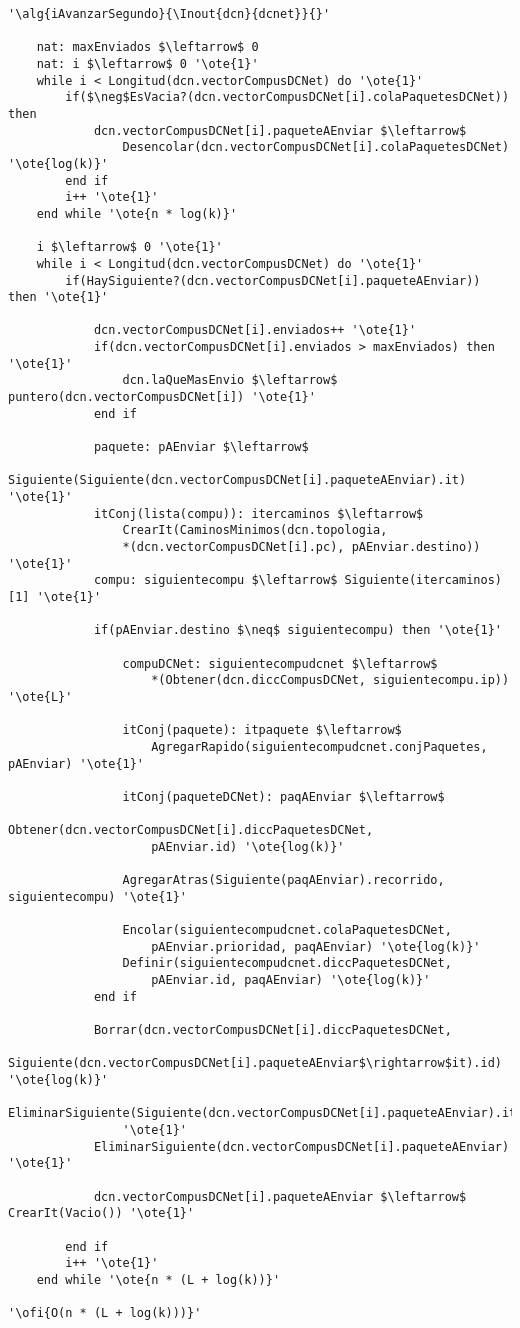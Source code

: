 \begin{lstlisting}[mathescape]
'\alg{iAvanzarSegundo}{\Inout{dcn}{dcnet}}{}'

	nat: maxEnviados $\leftarrow$ 0
	nat: i $\leftarrow$ 0 '\ote{1}'
	while i < Longitud(dcn.vectorCompusDCNet) do '\ote{1}'
		if($\neg$EsVacia?(dcn.vectorCompusDCNet[i].colaPaquetesDCNet)) then
			dcn.vectorCompusDCNet[i].paqueteAEnviar $\leftarrow$
				Desencolar(dcn.vectorCompusDCNet[i].colaPaquetesDCNet) '\ote{log(k)}'
		end if
		i++ '\ote{1}'
	end while '\ote{n * log(k)}'

	i $\leftarrow$ 0 '\ote{1}'
	while i < Longitud(dcn.vectorCompusDCNet) do '\ote{1}'
		if(HaySiguiente?(dcn.vectorCompusDCNet[i].paqueteAEnviar)) then '\ote{1}'

			dcn.vectorCompusDCNet[i].enviados++ '\ote{1}'
			if(dcn.vectorCompusDCNet[i].enviados > maxEnviados) then '\ote{1}'
				dcn.laQueMasEnvio $\leftarrow$ puntero(dcn.vectorCompusDCNet[i]) '\ote{1}'
			end if

			paquete: pAEnviar $\leftarrow$
				Siguiente(Siguiente(dcn.vectorCompusDCNet[i].paqueteAEnviar).it) '\ote{1}'
			itConj(lista(compu)): itercaminos $\leftarrow$
				CrearIt(CaminosMinimos(dcn.topologia,
				*(dcn.vectorCompusDCNet[i].pc), pAEnviar.destino)) '\ote{1}'
			compu: siguientecompu $\leftarrow$ Siguiente(itercaminos)[1] '\ote{1}'

			if(pAEnviar.destino $\neq$ siguientecompu) then '\ote{1}'

				compuDCNet: siguientecompudcnet $\leftarrow$
					*(Obtener(dcn.diccCompusDCNet, siguientecompu.ip)) '\ote{L}'

				itConj(paquete): itpaquete $\leftarrow$
					AgregarRapido(siguientecompudcnet.conjPaquetes, pAEnviar) '\ote{1}'

				itConj(paqueteDCNet): paqAEnviar $\leftarrow$
					Obtener(dcn.vectorCompusDCNet[i].diccPaquetesDCNet,
					pAEnviar.id) '\ote{log(k)}'

				AgregarAtras(Siguiente(paqAEnviar).recorrido, siguientecompu) '\ote{1}'

				Encolar(siguientecompudcnet.colaPaquetesDCNet,
					pAEnviar.prioridad, paqAEnviar) '\ote{log(k)}'
				Definir(siguientecompudcnet.diccPaquetesDCNet,
					pAEnviar.id, paqAEnviar) '\ote{log(k)}'
			end if

			Borrar(dcn.vectorCompusDCNet[i].diccPaquetesDCNet,
				Siguiente(dcn.vectorCompusDCNet[i].paqueteAEnviar$\rightarrow$it).id) '\ote{log(k)}'
			EliminarSiguiente(Siguiente(dcn.vectorCompusDCNet[i].paqueteAEnviar).it)
				'\ote{1}'
			EliminarSiguiente(dcn.vectorCompusDCNet[i].paqueteAEnviar) '\ote{1}'

			dcn.vectorCompusDCNet[i].paqueteAEnviar $\leftarrow$ CrearIt(Vacio()) '\ote{1}'

		end if
		i++ '\ote{1}'
	end while '\ote{n * (L + log(k))}'

'\ofi{O(n * (L + log(k)))}'
\end{lstlisting}

